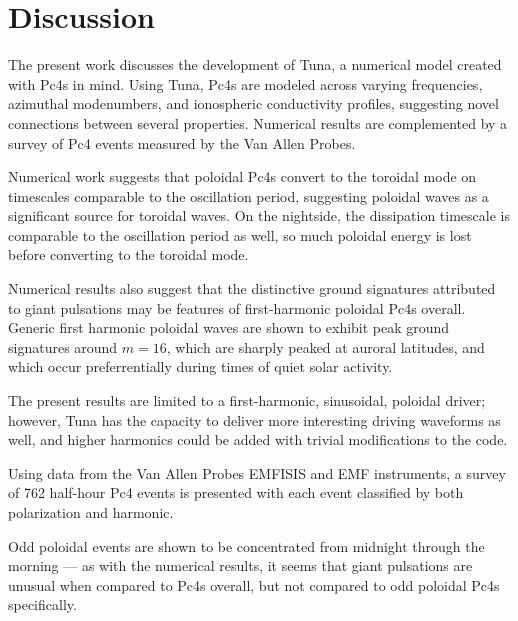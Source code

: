 \documentclass[draft,linenumbers]{agujournal}
\begin{document}


\section{Discussion}

The present work discusses the development of Tuna, a numerical model created with Pc4s in mind. Using Tuna, Pc4s are modeled across varying frequencies, azimuthal modenumbers, and ionospheric conductivity profiles, suggesting novel connections between several properties. Numerical results are complemented by a survey of Pc4 events measured by the Van Allen Probes.

Numerical work suggests that poloidal Pc4s convert to the toroidal mode on timescales comparable to the oscillation period, suggesting poloidal waves as a significant source for toroidal waves. On the nightside, the dissipation timescale is comparable to the oscillation period as well, so much poloidal energy is lost before converting to the toroidal mode.

Numerical results also suggest that the distinctive ground signatures attributed to giant pulsations may be features of first-harmonic poloidal Pc4s overall. Generic first harmonic poloidal waves are shown to exhibit peak ground signatures around ${m = 16}$, which are sharply peaked at auroral latitudes, and which occur preferrentially during times of quiet solar activity.

The present results are limited to a first-harmonic, sinusoidal, poloidal driver; however, Tuna has the capacity to deliver more interesting driving waveforms as well, and higher harmonics could be added with trivial modifications to the code.


Using data from the Van Allen Probes EMFISIS and EMF instruments, a survey of 762 half-hour Pc4 events is presented with each event classified by both polarization and harmonic.

Odd poloidal events are shown to be concentrated from midnight through the morning --- as with the numerical results, it seems that giant pulsations are unusual when compared to Pc4s overall, but not compared to odd poloidal Pc4s specifically.
\end{document}
